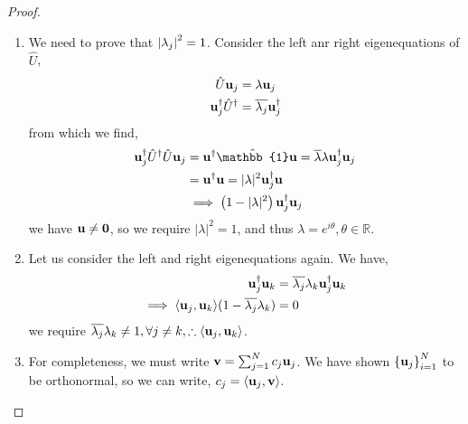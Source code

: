 \documentclass{book}
\def\innerproduct#1#2{{\langle #1},{#2 \rangle}}
\begin{document}
\begin{proof}
	\begin{enumerate}
		\item We need to prove that $\abs{\lambda_j}^2 = 1$. Consider the left anr right eigenequations of $\hat{U}$,
		\begin{align}
			\hat{U}\vb{u}_j &= \lambda\vb{u}_j\\
			\vb{u}_j^{\dag}\hat{U}^{\dag} & = \overline{\lambda_j} \vb{u}_j^{\dag}
		\end{align}
		from which we find,
		\begin{equation}
			\begin{split}
			\vb{u}_j^{\dag}\hat{U}^{\dag}\hat{U}\vb{u}_j & = \vb{u}^{\dag}\hat{\mathbb{1}}\vb{u} = \overline{\lambda}\lambda\vb{u}^{\dag}_j\vb{u}_j \\
			& = \vb{u}^{\dag}\vb{u} = |\lambda|^2\vb{u}_j^{\dag}\vb{u} \\
			& \implies \left(1 - |\lambda|^2\right)\vb{u}^{\dag}_j\vb{u}_j
			\end{split}
		\end{equation}
		we have $\vb{u} \neq \vb{0}$, so we require $|\lambda|^2 = 1$, and thus $\lambda = e^{i\theta}, \theta \in \mathbb{R}$.
		\item Let us consider the left and right eigenequations again. We have,
		\begin{equation}
			\begin{split}
				\vb{u}_j^{\dag}\vb{u}_k & = \overline{\lambda_j}\lambda_k\vb{u}_j^{\dag}\vb{u}_k \\
				\implies \innerproduct{\vb{u}_j}{\vb{u}_k}(1 - \overline{\lambda_j}\lambda_k) & = 0
			\end{split}
		\end{equation}
		we require $\overline{\lambda_j}\lambda_k \neq 1, \forall j \neq k, \therefore \innerproduct{\vb{u}_j}{\vb{u}_k}$.
		\item For completeness, we must write $\vb{v} = \sum_{j=1}^Nc_j\vb{u}_j$. We have shown $\left\{\vb{u}_j\right\}_{i=1}^N$ to be orthonormal, so we can write,
			$c_j = \innerproduct{\vb{u}_j}{\vb{v}}$.
	\end{enumerate}
\end{proof}
\end{document}
